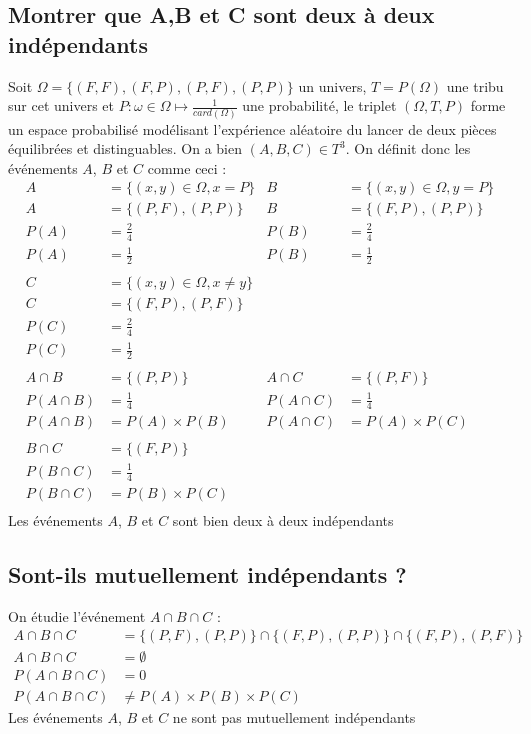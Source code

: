 \documentclass[10pt,a4paper,twoside]{article}
\begin{document}
\subsection{Montrer que A,B et C sont deux à deux indépendants}
Soit $\Omega = \{(F,F),(F,P),(P,F),(P,P)\}$ un univers, $T=P(\Omega)$ une tribu sur cet univers et $P:\omega\in\Omega \mapsto \frac{1}{card(\Omega)}$ une probabilité, le triplet $(\Omega,T,P)$ forme un espace probabilisé modélisant l'expérience aléatoire du lancer de deux pièces équilibrées et distinguables. On a bien $(A,B,C)\in T^{3}$. On définit donc les événements $A$, $B$ et $C$ comme ceci :
\begin{align*}
A & = \{(x,y)\in \Omega, x=P\} & B & = \{(x,y)\in \Omega, y=P\} \\
A &= \{(P,F),(P,P)\} & B &= \{(F,P),(P,P)\}\\
P(A) &= \frac{2}{4} & P(B) &= \frac{2}{4}\\
P(A) &= \frac{1}{2} & P(B) &= \frac{1}{2}\\
\\
C & = \{(x,y)\in \Omega, x\neq y\}\\
C &=\{(F,P),(P,F)\}\\
P(C) &= \frac{2}{4}\\
P(C) &= \frac{1}{2}\\
\\
A\cap B &= \{(P,P)\} & A\cap C &= \{(P,F)\}\\
P(A\cap B)&=\frac{1}{4} & P(A\cap C)&=\frac{1}{4}\\
P(A\cap B)&=P(A)\times P(B) & P(A\cap C)&=P(A)\times P(C)\\
\\
B\cap C &= \{(F,P)\}\\
P(B\cap C)&=\frac{1}{4}\\
P(B\cap C)&=P(B)\times P(C)\\
\end{align*}
Les événements $A$, $B$ et $C$ sont bien deux à deux indépendants

\subsection{Sont-ils mutuellement indépendants ?}
On étudie l'événement $A\cap B\cap C$ :
\begin{align*}
A\cap B \cap C &= \{(P,F),(P,P)\} \cap \{(F,P),(P,P)\} \cap \{(F,P),(P,F)\}\\
A\cap B \cap C &= \emptyset\\
P(A\cap B \cap C) &= 0\\
P(A\cap B \cap C) &\neq P(A) \times P(B) \times P(C)
\end{align*} 
Les événements $A$, $B$ et $C$ ne sont pas mutuellement indépendants
\end{document}
